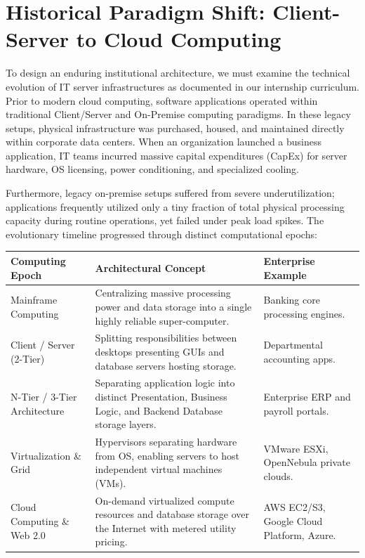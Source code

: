 \documentclass[11pt,a4paper]{report}
\begin{document}
\section{Historical Paradigm Shift: Client-Server to Cloud Computing}
To design an enduring institutional architecture, we must examine the technical evolution of IT server infrastructures as documented in our internship curriculum. Prior to modern cloud computing, software applications operated within traditional Client/Server and On-Premise computing paradigms. In these legacy setups, physical infrastructure was purchased, housed, and maintained directly within corporate data centers. When an organization launched a business application, IT teams incurred massive capital expenditures (CapEx) for server hardware, OS licensing, power conditioning, and specialized cooling.

Furthermore, legacy on-premise setups suffered from severe underutilization; applications frequently utilized only a tiny fraction of total physical processing capacity during routine operations, yet failed under peak load spikes. The evolutionary timeline progressed through distinct computational epochs:

\vspace{10pt}
\noindent
\begin{center}
\renewcommand{\arraystretch}{1.3}
\begin{tabular}{|L{3.5cm}|L{6.8cm}|L{4.5cm}|}
\hline
{}
\textbf{\color{white}Computing Epoch} & \textbf{\color{white}Architectural Concept} & \textbf{\color{white}Enterprise Example} \\
\hline
Mainframe Computing & Centralizing massive processing power and data storage into a single highly reliable super-computer. & Banking core processing engines. \\
\hline
{}
Client / Server (2-Tier) & Splitting responsibilities between desktops presenting GUIs and database servers hosting storage. & Departmental accounting apps. \\
\hline
N-Tier / 3-Tier Architecture & Separating application logic into distinct Presentation, Business Logic, and Backend Database storage layers. & Enterprise ERP and payroll portals. \\
\hline
{}
Virtualization \& Grid & Hypervisors separating hardware from OS, enabling servers to host independent virtual machines (VMs). & VMware ESXi, OpenNebula private clouds. \\
\hline
Cloud Computing \& Web 2.0 & On-demand virtualized compute resources and database storage over the Internet with metered utility pricing. & AWS EC2/S3, Google Cloud Platform, Azure. \\
\hline
\end{tabular}
\end{center}
\end{document}
